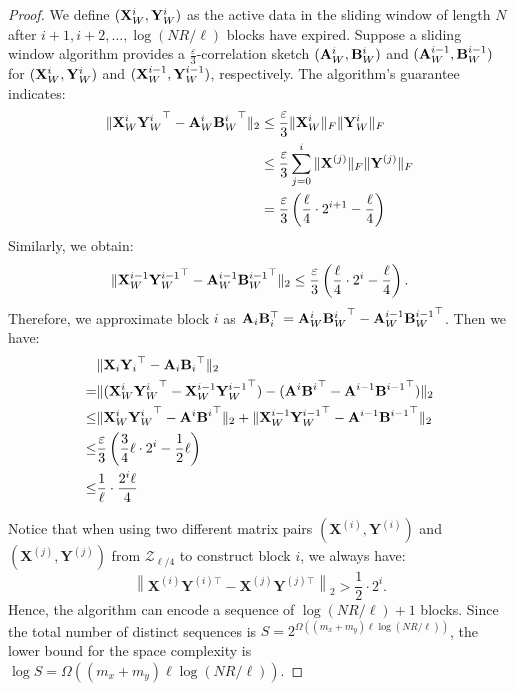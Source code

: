 \begin{proof}
    We define \( ({\bf X}_W^i, {\bf Y}_W^i) \) as the active data in the sliding window of length \( N \) after \( i+1, i+2, \dots, \log{(NR/\ell)} \) blocks have expired. Suppose a sliding window algorithm provides a \( \frac{\varepsilon}{3} \)-correlation sketch \( ({\bf A}_W^i, {\bf B}_W^i) \) and \( ({\bf A}_W^{i-1}, {\bf B}_W^{i-1}) \) for \( ({\bf X}_W^i, {\bf Y}_W^i) \) and \( ({\bf X}_W^{i-1}, {\bf Y}_W^{i-1}) \), respectively. The algorithm's guarantee indicates:
    \begin{align}
        \| {\bf X}_W^i{{\bf Y}_W^{i}}^\top - {\bf A}_W^i{{\bf B}_W^{i}}^\top \|_2 &\leq \frac{\varepsilon}{3} \|{\bf X}_W^i\|_F\|{\bf Y}_W^i\|_F \nonumber\\
        &\leq  \frac{\varepsilon}{3} \sum_{j=0}^i{\|{\bf X}^{(j)}\|_F\|{\bf Y}^{(j)}\|_F} \nonumber\\
        &= \frac{\varepsilon}{3}\left( \frac{\ell}{4}\cdot2^{i+1}-\frac{\ell}{4} \right)\nonumber
    \end{align}
    Similarly, we obtain:
    \[
    \| {\bf X}_W^{i-1} {{\bf Y}_W^{i-1}}^\top - {\bf A}_W^{i-1} {{\bf B}_W^{i-1}}^\top \|_2 \leq \frac{\varepsilon}{3}  \left( \frac{\ell}{4} \cdot 2^i - \frac{\ell}{4} \right).
    \]
    Therefore, we approximate block \( i \) as \( {\bf A}_i {\bf B}_i^\top = {\bf A}_W^i{{\bf B}_W^{i}}^\top - {\bf A}_W^{i-1} {{\bf B}_W^{i-1}}^\top \). Then we have:
    \begin{align}
        &\| {\bf X}_i {{\bf Y}_{i}}^\top - {\bf A}_{i}{{\bf B}_{i}}^\top \|_2 \nonumber\\
        = &\| ({\bf X}_W^i {{\bf Y}_W^{i}}^\top - {\bf X}_W^{i-1} {{\bf Y}_W^{i-1}}^\top) - ({\bf A}^i {{\bf B}^{i}}^\top - {\bf A}^{i-1} {{\bf B}^{i-1}}^\top) \|_2 \nonumber\\
        \leq & \| {\bf X}_W^i {{\bf Y}_W^{i}}^\top - {\bf A}^i {{\bf B}^{i}}^\top \|_2 + \| {\bf X}_W^{i-1} {{\bf Y}_W^{i-1}}^\top - {\bf A}^{i-1} {{\bf B}^{i-1}}^\top \|_2 \nonumber\\
        \leq & \frac{\varepsilon}{3} \left( \frac{3}{4}\ell\cdot2^i - \frac{1}{2}\ell \right) \nonumber\\
        \leq &  \frac{1}{\ell} \cdot \frac{2^i \ell}{4} \nonumber
    \end{align}
    
    Notice that when using two different matrix pairs \( (\mathbf{X}^{(i)}, \mathbf{Y}^{(i)}) \) and \( (\mathbf{X}^{(j)}, \mathbf{Y}^{(j)}) \) from \( \mathcal{Z}_{\ell/4} \) to construct block \( i \), we always have:
    $$\left\|\mathbf{X}^{(i)} \mathbf{Y}^{(i)\top} - \mathbf{X}^{(j)} \mathbf{Y}^{(j)\top}\right\|_2 > \frac{1}{2} \cdot 2^i.$$ 
    Hence, the algorithm can encode a sequence of \( \log{(NR/\ell)} +1 \) blocks. Since the total number of distinct sequences is \( S = 2^{\Omega((m_x+m_y)\ell \log{(NR/\ell)})} \), the lower bound for the space complexity is \( \log{S} = \Omega((m_x + m_y)\ell \log{(NR/\ell)}) \).
\end{proof}
